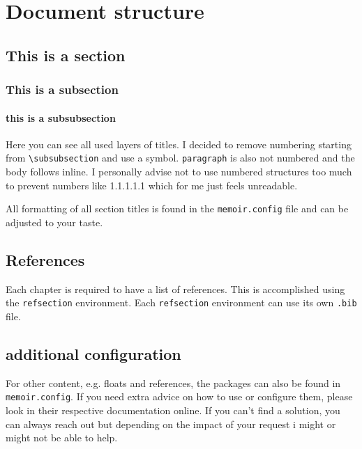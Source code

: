 \chapter{Document structure} \label{intro:chap}

\section{This is a section}

\subsection{This is a subsection} 

\subsubsection{this is a subsubsection}

Here you can see all used layers of titles. I decided to remove numbering starting from \verb=\subsubsection= and use a symbol. \verb=paragraph= is also not numbered and the body follows inline. I personally advise not to use numbered structures too much to prevent numbers like 1.1.1.1.1 which for me just feels unreadable. 

All formatting of all section titles is found in the \verb=memoir.config= file and can be adjusted to your taste.

\section{References}

Each chapter is required to have a list of references. This is accomplished using the \verb=refsection= environment. Each \verb=refsection= environment can use its own \verb=.bib= file.

\section{additional configuration}

For other content, e.g. floats and references, the packages can also be found in \verb=memoir.config=. If you need extra advice on how to use or configure them, please look in their respective documentation online. If you can't find a solution, you can always reach out but depending on the impact of your request i might or might not be able to help.
